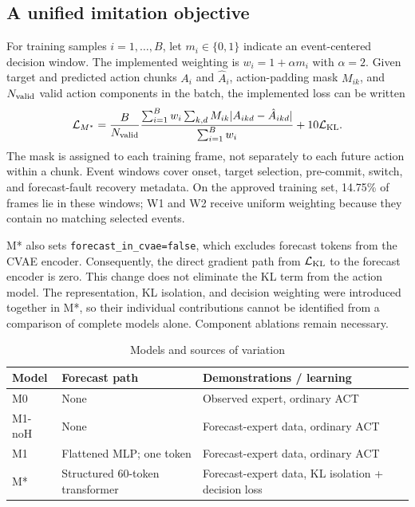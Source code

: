 \documentclass[conference]{IEEEtran}
\begin{document}
\subsection{A unified imitation objective}
For training samples $i=1,\ldots,B$, let $m_i\in\{0,1\}$ indicate an event-centered decision window. The implemented weighting is $w_i=1+\alpha m_i$ with $\alpha=2$. Given target and predicted action chunks $A_i$ and $\hat A_i$, action-padding mask $M_{ik}$, and $N_{\rm valid}$ valid action components in the batch, the implemented loss can be written
\begin{equation}
\mathcal L_{M^*}=
\frac{B}{N_{\rm valid}}
\frac{\sum_{i=1}^{B} w_i
  \sum_{k,d}M_{ik}|A_{ikd}-\hat A_{ikd}|}
{\sum_{i=1}^{B} w_i}
+10\mathcal L_{\rm KL}.
\label{eq:loss}
\end{equation}
The mask is assigned to each training frame, not separately to each future action within a chunk. Event windows cover onset, target selection, pre-commit, switch, and forecast-fault recovery metadata. On the approved training set, 14.75\% of frames lie in these windows; W1 and W2 receive uniform weighting because they contain no matching selected events.

M* also sets \texttt{forecast\_in\_cvae=false}, which excludes forecast tokens from the CVAE encoder. Consequently, the direct gradient path from $\mathcal L_{\rm KL}$ to the forecast encoder is zero. This change does not eliminate the KL term from the action model. The representation, KL isolation, and decision weighting were introduced together in M*, so their individual contributions cannot be identified from a comparison of complete models alone. Component ablations remain necessary.

\begin{table}[t]
\caption{Models and sources of variation}
\label{tab:models}
\centering\footnotesize
\begin{tabular}{p{}p{}p{}}
\toprule
Model & Forecast path & Demonstrations / learning\\
\midrule
M0 & None & Observed expert, ordinary ACT\\
M1-noH & None & Forecast-expert data, ordinary ACT\\
M1 & Flattened MLP; one token & Forecast-expert data, ordinary ACT\\
M* & Structured 60-token transformer & Forecast-expert data, KL isolation + decision loss\\
\bottomrule
\end{tabular}
\end{table}
\end{document}
